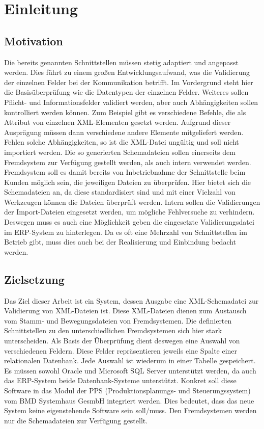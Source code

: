 \chapter{Einleitung}
\label{cha:Einleitung}

\section{Motivation}
Die bereits genannten Schnittstellen müssen stetig adaptiert und angepasst werden.
Dies führt zu einem großen Entwicklungsaufwand, was die Validierung der einzelnen Felder bei der Kommunikation betrifft. 
Im Vordergrund steht hier die Basisüberprüfung wie die Datentypen der einzelnen Felder. Weiteres sollen Pflicht- und Informationsfelder validiert werden, aber auch Abhängigkeiten sollen kontrolliert werden können. 
Zum Beispiel gibt es verschiedene Befehle, die als Attribut von einzelnen XML-Elementen gesetzt werden. Aufgrund dieser Ausprägung müssen dann verschiedene andere Elemente mitgeliefert werden. Fehlen solche Abhängigkeiten, so ist die XML-Datei ungültig und soll nicht importiert werden.
Die so generierten Schemadateien sollen einerseits dem Fremdsystem zur Verfügung gestellt werden, als auch intern verwendet werden. 
Fremdsystem soll es damit bereits von Inbetriebnahme der Schnittstelle beim Kunden möglich sein, die jeweiligen Dateien zu überprüfen. 
Hier bietet sich die Schemadateien an, da diese standardisiert sind und mit einer Vielzahl von Werkzeugen können die Dateien überprüft werden. 
Intern sollen die Validierungen der Import-Dateien eingesetzt werden, um mögliche Fehlversuche zu verhindern. Deswegen muss es auch eine Möglichkeit geben die eingesetzte Validierungsdatei im ERP-System zu hinterlegen. 
Da es oft eine Mehrzahl von Schnittstellen im Betrieb gibt, muss dies auch bei der Realisierung und Einbindung bedacht werden.


\section{Zielsetzung}
Das Ziel dieser Arbeit ist ein System, dessen Ausgabe eine 
XML-Schemadatei zur Validierung von XML-Dateien ist. 
Diese XML-Dateien dienen zum Austausch vom Stamm- und 
Bewegungsdateien von Fremdsystemen. Die definierten 
Schnittstellen zu den unterschiedlichen Fremdsystemen 
sich hier stark unterscheiden. Als Basis der Überprüfung 
dient deswegen eine Auswahl von verschiedenen Feldern. 
Diese Felder repräsentieren jeweils eine Spalte einer relationalen Datenbank. 
Jede Auswahl ist wiederum in einer Tabelle gespeichert.
Es müssen sowohl Oracle und Microsoft SQL Server unterstützt werden, da auch das ERP-System beide Datenbank-Systeme unterstützt. 
Konkret soll diese Software in das Modul der PPS (Produktionsplanungs- und Steuerungssystem) vom BMD Systemhaus GesmbH integriert werden. 
Dies bedeutet, dass das neue System keine eigenstehende Software sein soll/muss. 
Den Fremdsystemen werden nur die Schemadateien zur Verfügung gestellt.


